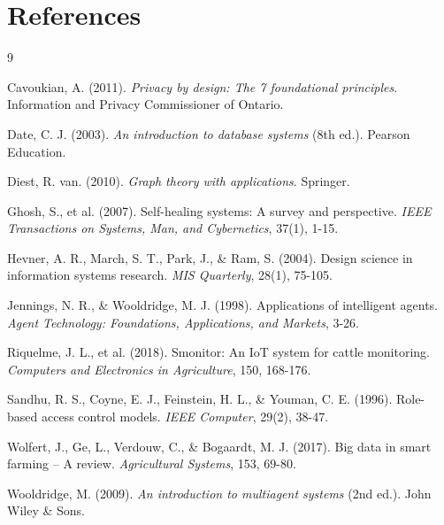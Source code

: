 
\chapter*{References}


\begin{thebibliography}{9}

Cavoukian, A. (2011).
\textit{Privacy by design: The 7 foundational principles}.
Information and Privacy Commissioner of Ontario.

Date, C. J. (2003).
\textit{An introduction to database systems} (8th ed.).
Pearson Education.

Diest, R. van. (2010).
\textit{Graph theory with applications}.
Springer.

Ghosh, S., et al. (2007).
Self-healing systems: A survey and perspective.
\textit{IEEE Transactions on Systems, Man, and Cybernetics}, 37(1), 1-15.

Hevner, A. R., March, S. T., Park, J., \& Ram, S. (2004).
Design science in information systems research.
\textit{MIS Quarterly}, 28(1), 75-105.

Jennings, N. R., \& Wooldridge, M. J. (1998).
Applications of intelligent agents.
\textit{Agent Technology: Foundations, Applications, and Markets}, 3-26.

Riquelme, J. L., et al. (2018).
Smonitor: An IoT system for cattle monitoring.
\textit{Computers and Electronics in Agriculture}, 150, 168-176.

Sandhu, R. S., Coyne, E. J., Feinstein, H. L., \& Youman, C. E. (1996).
Role-based access control models.
\textit{IEEE Computer}, 29(2), 38-47.

Wolfert, J., Ge, L., Verdouw, C., \& Bogaardt, M. J. (2017).
Big data in smart farming – A review.
\textit{Agricultural Systems}, 153, 69-80.

Wooldridge, M. (2009).
\textit{An introduction to multiagent systems} (2nd ed.).
John Wiley \& Sons.

\end{thebibliography}
